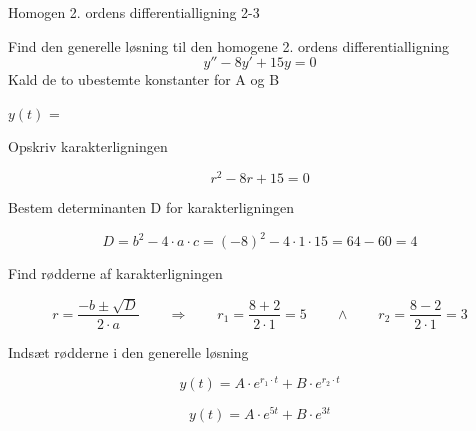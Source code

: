 \documentclass{article}
\begin{document}
\begin{exercise}{Homogen 2. ordens differentialligning 2-3}

Find den generelle løsning til den homogene 2. ordens differentialligning
\[
y'' - 8y' + 15y = 0
\]
Kald de to ubestemte konstanter for A og B

$y(t)$ = 


\hint

Opskriv karakterligningen

\hint

\[
r^2 - 8r + 15 = 0
\]


\hint

Bestem determinanten D for karakterligningen


\hint
\[
D = b^2 - 4 \cdot a \cdot c = (-8)^2 - 4 \cdot 1 \cdot 15 = 64 - 60 = 4
\]

\hint
Find rødderne af karakterligningen


\hint

\[
r = \frac{-b \pm \sqrt{D}}{2 \cdot a} \qquad \Rightarrow \qquad r_1 = \frac{8 + 2}{2 \cdot 1} = 5 \qquad \wedge \qquad r_2 = \frac{8 - 2}{2 \cdot 1} = 3
\]

\hint

Indsæt rødderne i den generelle løsning

\hint
\[
y(t) = A \cdot e^{r_1 \cdot t} + B \cdot e^{r_2\cdot t}
\]

\hint

\[
y(t) = A \cdot e^{5t} + B \cdot e^{3t}
\]

\end{exercise}

\newpage
\end{document}
